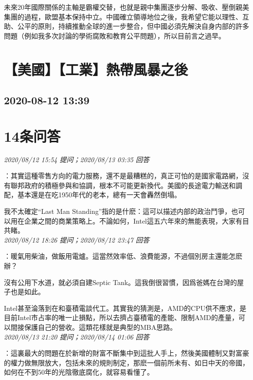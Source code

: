 \documentclass[twocolumn]{ctexart}
\begin{document}
未來20年國際關係的主軸是霸權交替，也就是親中集團逐步分解、吸收、壓倒親美集團的過程，歐盟基本保持中立。中國確立領導地位之後，我希望它能以理性、互助、公平的原則，持續推動全球的進一步整合，但中國必須先解決自身内部的許多問題（例如我多次討論的學術腐敗和教育公平問題），所以目前言之過早。
\\


\section{【美國】【工業】熱帶風暴之後}
\subsection{2020-08-12 13:39}


\section{14条问答}

\textit{\hfill\noindent\small 2020/08/12 15:54 提问；2020/08/13 03:35 回答}

：其實這種零售方向的電力服務，還不是最糟糕的，真正可怕的是國家電路網，沒有聯邦政府的積極參與和協調，根本不可能更新換代。美國的長途電力輸送和調配，基本還是在吃1950年代的老本，總有一天會轟然倒塌。

我不太確定“Last Man Standing”指的是什麽：這可以描述内部的政治鬥爭，也可以用在企業之間的商業策略上。不論如何，Intel這五六年來的無能表現，大家有目共睹。
\\

\textit{\hfill\noindent\small 2020/08/12 18:26 提问；2020/08/12 23:47 回答}

：暖氣用柴油，做飯用電爐。這當然效率低、浪費能源，不過個別房主還能怎麽辦？

沒有公用下水道，就必須自建Septic Tank。這我倒很習慣，因爲爸媽在台灣的屋子也是如此。

Intel甚至淪落到在和臺積電談代工。其實我的猜測是，AMD的CPU供不應求，是目前Intel市占率的唯一止損點，所以去擠占臺積電的產能、限制AMD的產量，可以間接保護自己的營收。這類花樣就是典型的MBA思路。
\\

\textit{\hfill\noindent\small 2020/08/13 21:20 提问；2020/08/14 01:06 回答}

：這裏最大的問題在於新增的財富不斷集中到這批人手上，然後美國體制又對富豪的權力做無限放大，包括未來的規則制定，那麽一個前所未有、如日中天的帝國，如何在不到50年的光陰徹底腐化，就容易看懂了。
\\
\end{document}
